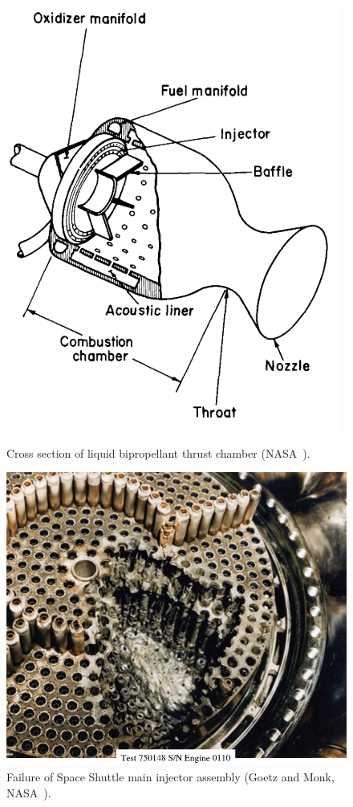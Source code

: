 \begin{figure}
	\begin{minipage}{0.48\linewidth}
		\centering
		\includegraphics[width=0.61\linewidth]{Chapters/Overview/Images/nasa_thrust_chamber_cross_sec.png}
		\caption{\label{fig:tcCrossSec}Cross section of liquid bipropellant thrust chamber (NASA~\cite{NASA1972}).}
	\end{minipage}
	\hspace{1em}
	\begin{minipage}{0.48\linewidth}
		\centering
		\includegraphics[width=0.9\linewidth]{Chapters/Overview/Images/ssmi_failure_border.png}
		\caption{\label{fig:ssmiFailure}Failure of Space Shuttle main injector assembly (Goetz and Monk, NASA~\cite{Goetz2003}).}
	\end{minipage}
\end{figure}

